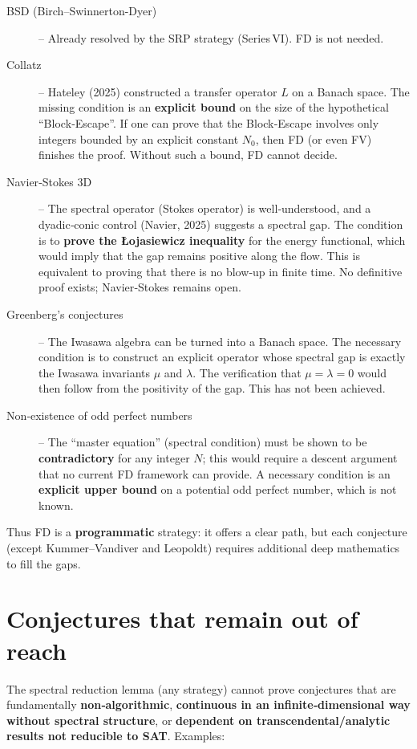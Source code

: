 \documentclass[11pt,a4paper]{article}
\begin{document}
\begin{description}
\item[BSD (Birch–Swinnerton-Dyer)] – Already resolved by the SRP strategy (Series VI). FD is not needed.
\item[Collatz] – Hateley (2025) constructed a transfer operator $L$ on a Banach space. The missing condition is an \textbf{explicit bound} on the size of the hypothetical “Block‑Escape”. If one can prove that the Block‑Escape involves only integers bounded by an explicit constant $N_0$, then FD (or even FV) finishes the proof. Without such a bound, FD cannot decide.
\item[Navier‑Stokes 3D] – The spectral operator (Stokes operator) is well‑understood, and a dyadic‑conic control (Navier, 2025) suggests a spectral gap. The condition is to \textbf{prove the Łojasiewicz inequality} for the energy functional, which would imply that the gap remains positive along the flow. This is equivalent to proving that there is no blow‑up in finite time. No definitive proof exists; Navier‑Stokes remains open.
\item[Greenberg’s conjectures] – The Iwasawa algebra can be turned into a Banach space. The necessary condition is to construct an explicit operator whose spectral gap is exactly the Iwasawa invariants $\mu$ and $\lambda$. The verification that $\mu=\lambda=0$ would then follow from the positivity of the gap. This has not been achieved.
\item[Non‑existence of odd perfect numbers] – The “master equation” (spectral condition) must be shown to be \textbf{contradictory} for any integer $N$; this would require a descent argument that no current FD framework can provide. A necessary condition is an \textbf{explicit upper bound} on a potential odd perfect number, which is not known.
\end{description}

Thus FD is a \textbf{programmatic} strategy: it offers a clear path, but each conjecture (except Kummer–Vandiver and Leopoldt) requires additional deep mathematics to fill the gaps.

\section{Conjectures that remain out of reach}

The spectral reduction lemma (any strategy) cannot prove conjectures that are fundamentally \textbf{non‑algorithmic}, \textbf{continuous in an infinite‑dimensional way without spectral structure}, or \textbf{dependent on transcendental/analytic results not reducible to SAT}. Examples:
\end{document}
